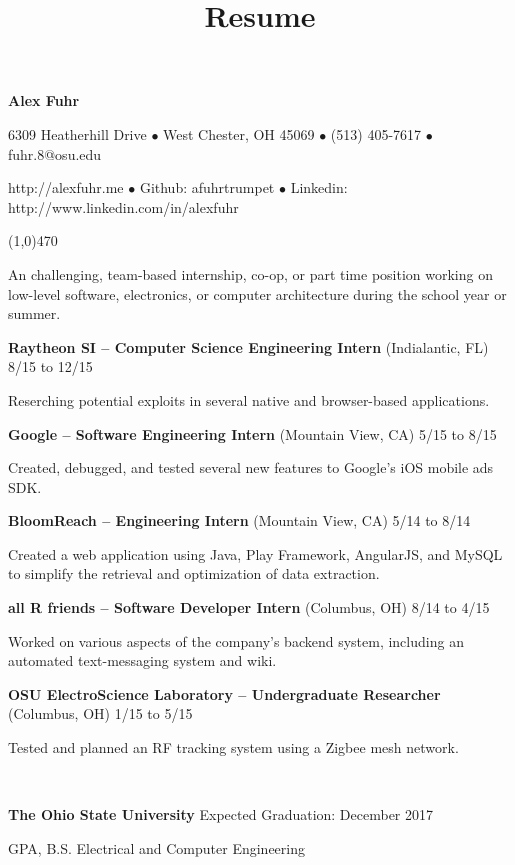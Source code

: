 \documentclass[10pt]{article}
\title{Resume}
\begin{document}
\centerline{{\LARGE \bf Alex Fuhr}}
\centerline{6309 Heatherhill Drive $\bullet$ West Chester, OH 45069 $\bullet$ (513) 405-7617 $\bullet$ fuhr.8@osu.edu}
\centerline{http://alexfuhr.me $\bullet$ Github: afuhrtrumpet $\bullet$ Linkedin: http://www.linkedin.com/in/alexfuhr}
\noindent
\line(1,0){470}\\

\smallskip

\noindent
An challenging, team-based internship, co-op, or part time position working on low-level software, electronics, or computer architecture during the school year or summer.
\medskip

\smallskip

\centerline{{\large {\bf Raytheon SI -- Computer Science Engineering Intern} (Indialantic, FL) \hfill 8/15 to 12/15}}
\noindent
Reserching potential exploits in several native and browser-based applications.
\smallskip

\centerline{{\large {\bf Google -- Software Engineering Intern} (Mountain View, CA) \hfill 5/15 to 8/15}}
\noindent
Created, debugged, and tested several new features to Google's iOS mobile ads SDK.
\smallskip

\centerline{{\large {\bf BloomReach -- Engineering Intern} (Mountain View, CA) \hfill 5/14 to 8/14}}
\noindent
Created a web application using Java, Play Framework, AngularJS, and MySQL to simplify the retrieval and optimization of data extraction.
\smallskip

\centerline{{\large {\bf all R friends -- Software Developer Intern} (Columbus, OH) \hfill 8/14 to 4/15}}
\noindent
Worked on various aspects of the company's backend system, including an automated text-messaging system and wiki.
\smallskip

\centerline{{\large {\bf OSU ElectroScience Laboratory -- Undergraduate Researcher} (Columbus, OH) \hfill 1/15 to 5/15}}
\noindent
Tested and planned an RF tracking system using a Zigbee mesh network.
\smallskip

\\
\smallskip
\centerline{{\large {\bf The Ohio State University} \hfill Expected Graduation: December 2017}}
 GPA, B.S. Electrical and Computer Engineering
\medskip
\end{document}
